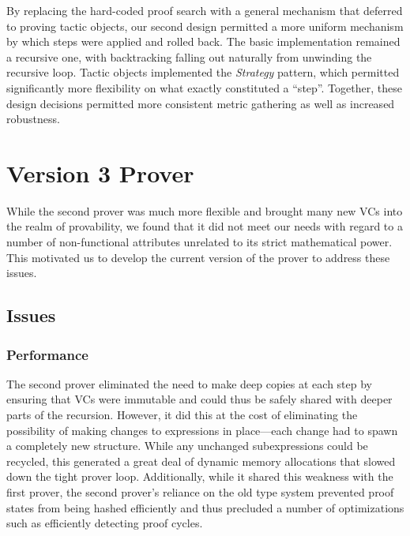 By replacing the hard-coded proof search with a general mechanism that deferred to proving tactic objects, our second design permitted a more uniform mechanism by which steps were applied and rolled back.  The basic implementation remained a recursive one, with backtracking falling out naturally from unwinding the recursive loop.  Tactic objects implemented the \emph{Strategy} pattern, which permitted significantly more flexibility on what exactly constituted a ``step''.  Together, these design decisions permitted more consistent metric gathering as well as increased robustness.


\section{Version 3 Prover}

While the second prover was much more flexible and brought many new VCs into the realm of provability, we found that it did not meet our needs with regard to a number of non-functional attributes unrelated to its strict mathematical power.  This motivated us to develop the current version of the prover to address these issues.

	\subsection{Issues}	%

		\subsubsection{Performance}	

The second prover eliminated the need to make deep copies at each step by ensuring that VCs were immutable and could thus be safely shared with deeper parts of the recursion.  However, it did this at the cost of eliminating the possibility of making changes to expressions in place---each change had to spawn a completely new structure.  While any unchanged subexpressions could be recycled, this generated a great deal of dynamic memory allocations that slowed down the tight prover loop.  Additionally, while it shared this weakness with the first prover, the second prover's reliance on the old type system prevented proof states from being hashed efficiently and thus precluded a number of optimizations such as efficiently detecting proof cycles.

